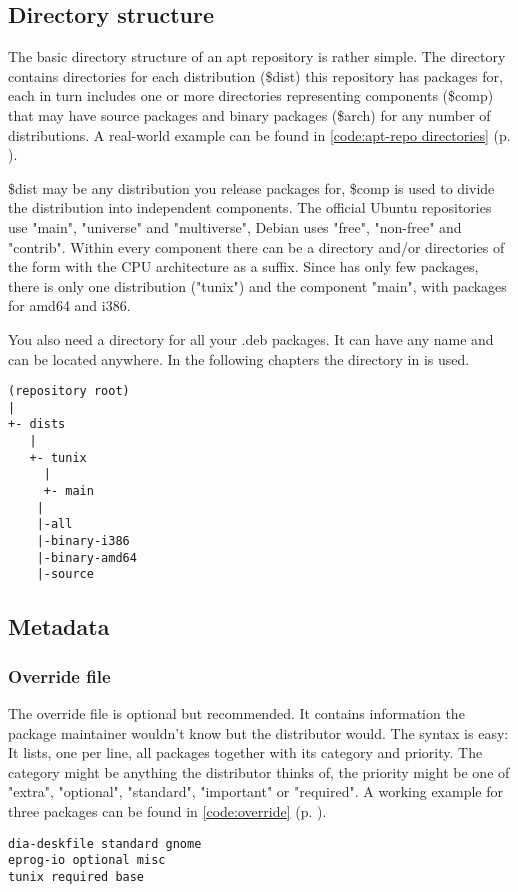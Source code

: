 \subsection{Directory structure}\label{directory structure}
The basic directory structure of an apt repository is rather simple. 
The  directory contains directories for
each distribution (\$dist) this repository has packages for, each in turn
includes one or more directories representing components (\$comp) that may have
source packages and binary packages (\$arch) for any number of distributions. A
real-world example can be found in \lstlistingname{} \ref{code:apt-repo directories}
(p. \pageref{code:apt-repo directories}).

\$dist may be any distribution you release packages for, \$comp is used to
divide the distribution into independent components. The official Ubuntu
repositories use "main", "universe" and "multiverse", Debian uses "free",
"non-free" and "contrib". Within every component there can be a 
directory and/or directories of the form  with the CPU
architecture as a suffix. Since \tunix has only few packages, there is only one
distribution ("tunix") and the component "main", with packages for amd64 and
i386.

You also need a directory for all your .deb packages. It can have any name and
can be located anywhere. In the following chapters the directory  in
 is used.

\begin{lstlisting}[label=code:apt-repo directories,caption=Basic structure of an
apt repository, float=ht]
(repository root)
|
+- dists
   |
   +- tunix
     |
     +- main
	|
	|-all
	|-binary-i386
	|-binary-amd64
	|-source
\end{lstlisting}

\subsection{Metadata}
\subsubsection{Override file}
The override file is optional but recommended. It contains information the
package maintainer wouldn't know but the distributor would. The
syntax is easy: It lists, one per line, all packages together with its category
and priority. The category might be anything the distributor thinks of, the
priority might be one of "extra", "optional", "standard", "important" or
"required". A working example for three
packages can be found in \lstlistingname{} \ref{code:override} (p.
\pageref{code:override}).
\begin{lstlisting}[label=code:override,caption=override file, float=ht]
dia-deskfile standard gnome
eprog-io optional misc
tunix required base
\end{lstlisting}


